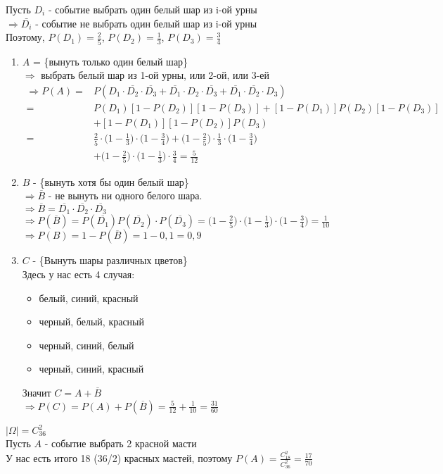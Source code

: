 \begin{exercise}[8]
	Пусть $D_i$ - событие выбрать один белый шар из i-ой урны \\ $\Rightarrow \bar{D_i}$ - событие не выбрать один белый шар из i-ой урны \\ Поэтому, $P(D_1) = \frac{2}{5}$, $P(D_2) = \frac{1}{3}$, $P(D_3) = \frac{3}{4}$
	
	\begin{enumerate}
		\item $A$ = \{вынуть только один белый шар\} \\ $\Rightarrow$ выбрать белый шар из 1-ой урны, или 2-ой, или 3-ей \begin{align*}
			\Rightarrow P(A) = & P(D_1 \cdot \overline{D_2} \cdot \overline{D_3} + \overline{D_1} \cdot D_2 \cdot \overline{D_3} + \overline{D_1} \cdot \overline{D_2} \cdot D_3) \\ = & P(D_1)[1-P(D_2)][1-P(D_3)] + [1-P(D_1)] P(D_2) [1-P(D_3)] \\ & + [1-P(D_1)] [1-P(D_2)] P(D_3) \\ = & \frac{2}{5} \cdot \Big(1 - \frac{1}{3}\Big) \cdot \Big(1 - \frac{3}{4}\Big) + \Big(1- \frac{2}{5}\Big) \cdot \frac{1}{3} \cdot \Big(1 - \frac{3}{4}\Big) \\ & + \Big(1 - \frac{2}{5}\Big) \cdot \Big(1 - \frac{1}{3}\Big) \cdot \frac{3}{4} = \frac{5}{12}
		\end{align*}
		\item $B$ - \{вынуть хотя бы один белый шар\} \\ $\Rightarrow \overline{B}$ - не вынуть ни одного белого шара. \\ $\Rightarrow \overline{B} = \overline{D_1} \cdot \overline{D_2} \cdot \overline{D_3}$ \\ $\Rightarrow P(\overline{B}) = P(\overline{D_1}) P(\overline{D_2}) \cdot P(\overline{D_3}) = \Big(1 - \frac{2}{5}\Big) \cdot \Big(1-\frac{1}{3}\Big) \cdot \Big(1 - \frac{3}{4}\Big) = \frac{1}{10}$ \\ $\Rightarrow P(B) = 1 - P(\overline{B}) = 1 - 0,1 = 0,9$
		\item $C$ - \{Вынуть шары различных цветов\} \\ Здесь у нас есть 4 случая:
		\begin{itemize}
			\item белый, синий, красный
			\item черный, белый, красный
			\item черный, синий, белый
			\item черный, синий, красный
		\end{itemize}
	Значит $C = A + \overline{B}$ \\ $\Rightarrow P(C) = P(A) + P(\overline{B}) = \frac{5}{12} + \frac{1}{10} = \frac{31}{60}$
	\end{enumerate}
\end{exercise}

\begin{exercise}[9]
	$| \Omega | = C^2_{36}$ \\ Пусть $A$ - событие выбрать 2 красной масти \\ У нас есть итого 18 (36/2) красных мастей, поэтому $P(A) = \frac{C^2_{18}}{C^2_{36}} = \frac{17}{70}$
\end{exercise}